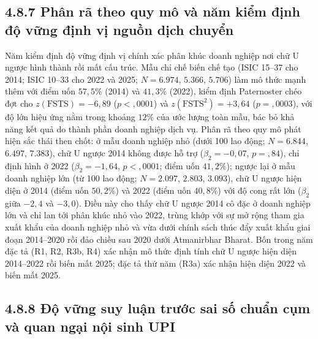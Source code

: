\documentclass[
  a4paper,
  13pt]{extreport}
\begin{document}
\hypertarget{phuxe2n-ruxe3-theo-quy-muxf4-vuxe0-nux103m-kiux1ec3m-ux111ux1ecbnh-ux111ux1ed9-vux1eefng-ux111ux1ecbnh-vux1ecb-nguux1ed3n-dux1ecbch-chuyux1ec3n}{%
\subsection{4.8.7 Phân rã theo quy mô và năm kiểm định độ vững định vị
nguồn dịch
chuyển}\label{phuxe2n-ruxe3-theo-quy-muxf4-vuxe0-nux103m-kiux1ec3m-ux111ux1ecbnh-ux111ux1ed9-vux1eefng-ux111ux1ecbnh-vux1ecb-nguux1ed3n-dux1ecbch-chuyux1ec3n}}

Năm kiểm định độ vững định vị chính xác phân khúc doanh nghiệp nơi chữ U
ngược hình thành rồi mất cấu trúc. Mẫu chỉ chế biến chế tạo (ISIC 15--37
cho 2014; ISIC 10--33 cho 2022 và 2025; \(N = 6.974\), \(5.366\),
\(5.706\)) làm mô thức mạnh thêm với điểm uốn \(57{,}5\%\) (2014) và
\(41{,}3\%\) (2022), kiểm định Paternoster chéo đợt cho
\(z(\mathrm{FSTS}) = -6{,}89\) (\(p < {,}0001\)) và
\(z(\mathrm{FSTS}^2) = +3{,}64\) (\(p = {,}0003\)), với độ lớn hiệu ứng
nằm trong khoảng \(12\%\) của ước lượng toàn mẫu, bác bỏ khả năng kết
quả do thành phần doanh nghiệp dịch vụ. Phân rã theo quy mô phát hiện
sắc thái then chốt: ở mẫu doanh nghiệp nhỏ (dưới 100 lao động;
\(N = 6.844\), \(6.497\), \(7.383\)), chữ U ngược 2014 không được hỗ trợ
(\(\beta_2 = -0{,}07\), \(p = {,}84\)), chỉ định hình ở 2022
(\(\beta_2 = -1{,}64\), \(p < {,}0001\); điểm uốn \(41{,}2\%\)); ngược
lại ở mẫu doanh nghiệp lớn (từ 100 lao động; \(N = 2.097\), \(2.803\),
\(3.093\)), chữ U ngược hiện diện ở 2014 (điểm uốn \(50{,}2\%\)) và 2022
(điểm uốn \(40{,}8\%\)) với độ cong rất lớn (\(\beta_2\) giữa \(-2{,}4\)
và \(-3{,}0\)). Điều này cho thấy chữ U ngược 2014 cô đặc ở doanh nghiệp
lớn và chỉ lan tới phân khúc nhỏ vào 2022, trùng khớp với sự mở rộng
tham gia xuất khẩu của doanh nghiệp nhỏ và vừa dưới chính sách thúc đẩy
xuất khẩu giai đoạn 2014--2020 rồi đảo chiều sau 2020 dưới Atmanirbhar
Bharat. Bốn trong năm đặc tả (R1, R2, R3b, R4) xác nhận mô thức định
tính chữ U ngược hiện diện 2014--2022 rồi biến mất 2025; đặc tả thứ năm
(R3a) xác nhận hiện diện 2022 và biến mất 2025.

\hypertarget{ux111ux1ed9-vux1eefng-suy-luux1eadn-trux1b0ux1edbc-sai-sux1ed1-chuux1ea9n-cux1ee5m-vuxe0-quan-ngux1ea1i-nux1ed9i-sinh-upi}{%
\subsection{4.8.8 Độ vững suy luận trước sai số chuẩn cụm và quan ngại
nội sinh
UPI}\label{ux111ux1ed9-vux1eefng-suy-luux1eadn-trux1b0ux1edbc-sai-sux1ed1-chuux1ea9n-cux1ee5m-vuxe0-quan-ngux1ea1i-nux1ed9i-sinh-upi}}
\end{document}
